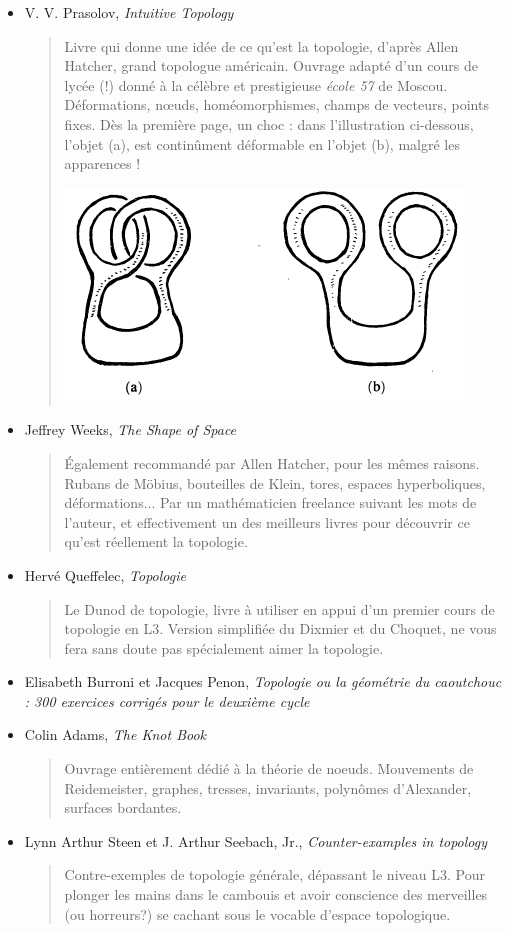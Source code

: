 \documentclass{article}
\begin{document}
\begin{itemize}
\item V. V. Prasolov, \emph{Intuitive Topology}
\begin{quote}
Livre qui \og donne une idée de ce qu'est la topologie\fg, d'après Allen Hatcher, grand topologue américain.  Ouvrage adapté d'un cours de lycée (!) donné à la célèbre et prestigieuse  \emph{école 57} de Moscou. Déformations, n\oe uds, homéomorphismes, champs de vecteurs, points fixes. Dès la première page, un choc : dans l'illustration ci-dessous, l'objet (a), est continûment déformable en l'objet (b), malgré les apparences !
\begin{center}
\includegraphics[scale=.6]{enlacement}
\end{center}
\end{quote}
\item Jeffrey Weeks, \emph{The Shape of Space}
\begin{quote}
Également recommandé par Allen Hatcher, pour les mêmes raisons. Rubans de Möbius, bouteilles de Klein, tores, espaces hyperboliques, déformations... Par un \og mathématicien freelance\fg{} suivant les mots de l'auteur, et effectivement un des meilleurs livres pour découvrir ce qu'est réellement la topologie.
\end{quote}
\item Hervé Queffelec, \emph{Topologie}
\begin{quote}
Le \og Dunod\fg{} de topologie, livre à utiliser en appui d'un premier cours de topologie en L3. Version simplifiée du Dixmier et du Choquet, ne vous fera sans doute pas spécialement aimer la topologie.
\end{quote}

\item  Elisabeth Burroni et Jacques Penon, \emph{Topologie ou la géométrie du caoutchouc : 300 exercices corrigés pour le deuxième cycle}
\item Colin Adams, \emph{The Knot Book}
\begin{quote}
Ouvrage entièrement dédié à la théorie de noeuds. Mouvements de Reidemeister, graphes, tresses, invariants, polynômes d'Alexander, surfaces bordantes.
\end{quote}
\item Lynn Arthur Steen et J. Arthur Seebach, Jr., \emph{Counter-examples in topology}
\begin{quote}
Contre-exemples de topologie générale, dépassant le niveau L3. Pour plonger les mains dans le cambouis et avoir conscience des  merveilles (ou horreurs?) se cachant sous le vocable d'\og espace topologique\fg.
\end{quote}
\end{itemize}
\end{document}
